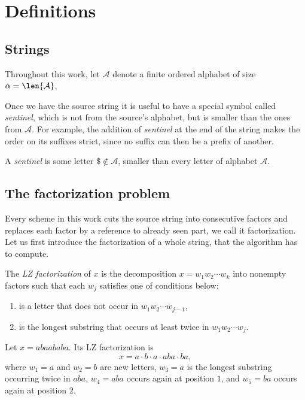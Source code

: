 \section{Definitions}
\label{seq:definitions}

\subsection{Strings}

Throughout this work, let \(\mathcal{A}\) denote a finite ordered alphabet of size \(\alpha =\len{\mathcal{A}}\).

Once we have the source string it is useful to have a special symbol called \emph{sentinel}, which is not from the source's alphabet, but is smaller than the ones from \(\mathcal{A}\). For example, the addition of \emph{sentinel} at the end of the string makes the order on its suffixes strict, since no suffix can then be a prefix of another.
\begin{definition}[Sentinel]
\label{def:sentinel}
    A \emph{sentinel} is some letter \(\$ \notin \mathcal{A}\), smaller than every letter of alphabet \(\mathcal{A}\).
\end{definition}

\subsection{The factorization problem}

Every scheme in this work cuts the source string into consecutive factors and replaces each factor by a reference to already seen part, we call it factorization.
Let us first introduce the factorization of a whole string, that the algorithm has to compute.
\begin{definition}
\label{def:lz-factorization}
    The \emph{LZ factorization} of \(x\) is the decomposition \(x = w_1 w_2 \cdots w_k\) into nonempty factors such that each \(w_j\) satisfies one of conditions below:
    \begin{enumerate}[label=(\alph*)]
      \item is a letter that does not occur in \(w_1 w_2 \cdots w_{j-1}\),
      \item is the longest substring that occurs at least twice in \(w_1 w_2 \cdots w_j\).
    \end{enumerate}
\end{definition}

\begin{example}
\label{ex:lz-factorization}
    Let \(x = abaababa\). Its LZ factorization is
    \[
      x = a \cdot b \cdot a \cdot aba \cdot ba,
    \]
    where \(w_1 = a\) and \(w_2 = b\) are new letters, \(w_3 = a\) is the longest substring occurring twice in \(aba\), \(w_4 = aba\) occurs again at position \(1\), and \(w_5 = ba\) occurs again at position \(2\).
\end{example}


